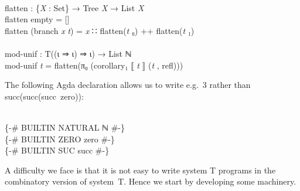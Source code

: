 \documentclass{entcs} \usepackage{prentcsmacro}
\newcommand{\AgdaC}[1]{\mbox{#1}}
\newcommand{\AgdaFontStyle}[1]{\textsf{#1}}
\newcommand{\AgdaBoundFontStyle}[1]{\textit{#1}}
\newcommand{\AgdaKeyword}     [1]
    {\AgdaFontStyle{\textcolor{AgdaKeyword}{#1}}}
\newcommand{\AgdaSymbol}      [1]{\textcolor{AgdaSymbol}{#1}}
\newcommand{\AgdaPrimitiveType}[1]
    {\AgdaFontStyle{\textcolor{AgdaPrimitiveType}{#1}}}
\newcommand{\AgdaBound}    [1]{\AgdaBoundFontStyle{\textcolor{AgdaBound}{#1}}}
\newcommand{\AgdaInductiveConstructor}[1]
    {\AgdaFontStyle{\textcolor{AgdaInductiveConstructor}{#1}}}
\newcommand{\AgdaDatatype} [1]{\AgdaFontStyle{\textcolor{AgdaDatatype}{#1}}}
\newcommand{\AgdaFunction} [1]{\AgdaFontStyle{\textcolor{AgdaFunction}{#1}}}
\newcommand{\AgdaCodeStyle}{\small}
\newenvironment{code}%
{\noindent\AgdaCodeStyle\pboxed}%
{\endpboxed\par\noindent%
\ignorespacesafterend}
\begin{document}
\begin{code}
\\
\>\AgdaFunction{flatten} \AgdaSymbol{:} \AgdaSymbol{\{}\AgdaBound{X} \AgdaSymbol{:} \AgdaPrimitiveType{Set}\AgdaSymbol{\}} \AgdaSymbol{→} \AgdaDatatype{Tree} \AgdaBound{X} \AgdaSymbol{→} \AgdaDatatype{List} \AgdaBound{X}\<%
\\
\>\AgdaFunction{flatten} \AgdaInductiveConstructor{empty} \AgdaSymbol{=} \AgdaInductiveConstructor{[]}\<%
\\
\>\AgdaFunction{flatten} \AgdaSymbol{(}\AgdaInductiveConstructor{branch} \AgdaBound{x} \AgdaBound{t}\AgdaSymbol{)} \AgdaSymbol{=} \AgdaBound{x} \AgdaInductiveConstructor{∷} \AgdaFunction{flatten}\AgdaSymbol{(}\AgdaBound{t} \AgdaInductiveConstructor{₀}\AgdaSymbol{)} \AgdaFunction{++} \AgdaFunction{flatten}\AgdaSymbol{(}\AgdaBound{t} \AgdaInductiveConstructor{₁}\AgdaSymbol{)}\<%
\\
%
\\
\>\AgdaFunction{mod-unif} \AgdaSymbol{:} \AgdaDatatype{T}\AgdaSymbol{((}\AgdaInductiveConstructor{ι} \AgdaInductiveConstructor{⇒} \AgdaInductiveConstructor{ι}\AgdaSymbol{)} \AgdaInductiveConstructor{⇒} \AgdaInductiveConstructor{ι}\AgdaSymbol{)} \AgdaSymbol{→} \AgdaDatatype{List} \AgdaDatatype{ℕ}\<%
\\
\>\AgdaFunction{mod-unif} \AgdaBound{t} \AgdaSymbol{=} \AgdaFunction{flatten}\AgdaSymbol{(}\AgdaFunction{π₀} \AgdaSymbol{(}\AgdaFunction{corollary₁} \AgdaFunction{⟦} \AgdaBound{t} \AgdaFunction{⟧} \AgdaSymbol{(}\AgdaBound{t} \AgdaInductiveConstructor{,} \AgdaInductiveConstructor{refl}\AgdaSymbol{)))}\<%
\\
\>\<\end{code}
The following Agda declaration allows us to write e.g.\ $3$ rather than
\AgdaC{succ(succ(succ zero))}:

\begin{code}\>\<%
\\
\>\AgdaSymbol{\{-\#} \AgdaKeyword{BUILTIN} NATURAL \AgdaDatatype{ℕ} \AgdaSymbol{\#-\}}\<%
\\
\>\AgdaSymbol{\{-\#} \AgdaKeyword{BUILTIN} ZERO \AgdaInductiveConstructor{zero} \AgdaSymbol{\#-\}}\<%
\\
\>\AgdaSymbol{\{-\#} \AgdaKeyword{BUILTIN} SUC \AgdaInductiveConstructor{succ} \AgdaSymbol{\#-\}}\<%
\\
\>\<\end{code}
A difficulty we face is that it is not easy to write system T
programs in the combinatory version of system~T. Hence we start by
developing some machinery.
\end{document}
